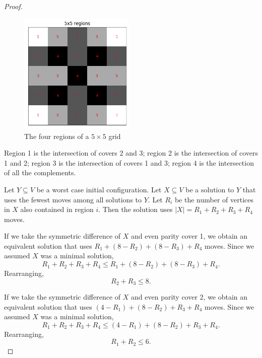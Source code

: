 \documentclass[a4paper]{article}
\newcommand{\abs}[1]{\left| #1 \right|}
\begin{document}
\begin{proof}
		\begin{figure}[H]
			\centering
			\includegraphics[width=0.49\textwidth]{../../code/serialization/regions/5x5_regions.png}
			\caption{The four regions of a $5 \times 5$ grid}
		\end{figure}
	
		Region 1 is the intersection of covers 2 and 3;
		region 2 is the intersection of  covers 1 and 2;
		region 3 is the intersection of covers 1 and 3;
		region 4 is the intersection of all the complements.
		
		Let $Y \subseteq V$ be a worst case initial configuration.
		Let $X \subseteq V$ be a solution to $Y$ that uses the fewest moves among all solutions to $Y$.
		Let $R_i$ be the number of vertices in $X$ also contained in region $i$.
		Then the solution uses $\abs{X} = R_1 + R_2 + R_3 + R_4$ moves.
		
		If we take the symmetric difference of $X$ and even parity cover 1, we obtain an equivalent solution that uses $R_1 + (8 - R_2) + (8 - R_3) + R_4$ moves.
		Since we assumed $X$ was a minimal solution,
		\begin{equation*}
			R_1 + R_2 + R_3 + R_4 \leq R_1 + (8 - R_2) + (8 - R_3) + R_4.
		\end{equation*}
		Rearranging,
		\begin{equation}\label{5x5_constr1}
			R_2 + R_3 \leq 8.
		\end{equation}
	
		If we take the symmetric difference of $X$ and even parity cover 2, we obtain an equivalent solution that uses $(4 - R_1) + (8 - R_2) + R_3 + R_4$ moves.
		Since we assumed $X$ was a minimal solution,
		\begin{equation*}
			R_1 + R_2 + R_3 + R_4 \leq (4 - R_1) + (8 - R_2) + R_3 + R_4.
		\end{equation*}
		Rearranging,
		\begin{equation}\label{5x5_constr2}
			R_1 + R_2 \leq 6.
		\end{equation}
	

\end{proof}
\end{document}
